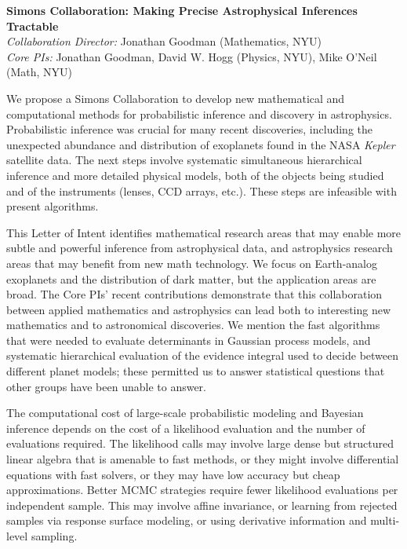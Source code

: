 \documentclass[12pt]{article}
\newcommand{\project}[1]{\textsl{#1}}
\begin{document}
\sloppy\sloppypar\thispagestyle{empty}

\begin{center}
\textbf{Simons Collaboration: Making Precise Astrophysical Inferences Tractable}\\
\textit{Collaboration Director:} Jonathan Goodman (Mathematics, NYU)\\
\textit{Core PIs:} Jonathan Goodman, David W. Hogg (Physics, NYU), Mike O'Neil (Math, NYU)
\end{center}
\smallskip

We propose a Simons Collaboration to develop new mathematical and computational 
methods for probabilistic inference and discovery in astrophysics.
Probabilistic inference was crucial for many recent discoveries,
including the unexpected abundance and distribution of
exoplanets found in the NASA \project{Kepler} satellite data.
The next steps involve systematic simultaneous hierarchical inference
and more detailed physical models, both of the objects being studied and of
the instruments (lenses, CCD arrays, etc.).
These steps are infeasible with present algorithms.

This Letter of Intent identifies mathematical research areas that may enable
more subtle and powerful inference from astrophysical data,
and astrophysics research areas that may benefit from new math technology.
We focus on Earth-analog exoplanets and the distribution of dark matter,
but the application areas are broad.
The Core PIs' recent contributions demonstrate that this collaboration
between applied mathematics and astrophysics
can lead both to interesting new mathematics and to astronomical discoveries.
We mention the fast algorithms that were needed to evaluate determinants in
Gaussian process models, and systematic hierarchical evaluation of the evidence
integral used to decide between different planet models; these permitted
us to answer statistical questions that other groups have been unable to answer.

The computational cost of large-scale probabilistic modeling and Bayesian 
inference depends on the cost of a likelihood evaluation and the number of evaluations required.
The likelihood calls may involve large dense but structured linear algebra
that is amenable to fast methods, or they might involve differential 
equations with fast solvers, or they may have low accuracy but cheap approximations.
Better MCMC strategies require fewer likelihood evaluations per independent sample.
This may involve affine invariance, or learning from rejected samples
via response surface modeling, or using derivative information and
multi-level sampling.
\end{document}
